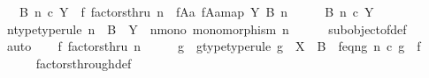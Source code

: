 \begin{isabellebody}
\ \ \ {\isachardoublequoteopen}{\isacharparenleft}{\kern0pt}B{\isacharcomma}{\kern0pt}\ n{\isacharparenright}{\kern0pt}\ {\isasymsubseteq}\isactrlsub c\ Y\ {\isasymLongrightarrow}\ f\ factorsthru\ n\ {\isasymLongrightarrow}\ {\isacharparenleft}{\kern0pt}f{\isasymlparr}A{\isasymrparr}\isactrlbsub a\isactrlesub {\isacharcomma}{\kern0pt}\ {\isacharbrackleft}{\kern0pt}f{\isasymlparr}A{\isasymrparr}\isactrlbsub a\isactrlesub {\isacharbrackright}{\kern0pt}map{\isacharparenright}{\kern0pt}\ {\isasymsubseteq}\isactrlbsub Y\isactrlesub \ {\isacharparenleft}{\kern0pt}B{\isacharcomma}{\kern0pt}\ n{\isacharparenright}{\kern0pt}{\isachardoublequoteclose}\isanewline
%
\isadelimproof
%
\endisadelimproof
%
\isatagproof
{}\isamarkupfalse%
\ {\isacharminus}{\kern0pt}\isanewline
\ \ \isamarkupfalse%
\ {\isachardoublequoteopen}{\isacharparenleft}{\kern0pt}B{\isacharcomma}{\kern0pt}\ n{\isacharparenright}{\kern0pt}\ {\isasymsubseteq}\isactrlsub c\ Y{\isachardoublequoteclose}\isanewline
\ \ \isamarkupfalse%
\ \isamarkupfalse%
\ n{\isacharunderscore}{\kern0pt}type{\isacharbrackleft}{\kern0pt}type{\isacharunderscore}{\kern0pt}rule{\isacharbrackright}{\kern0pt}{\isacharcolon}{\kern0pt}\ {\isachardoublequoteopen}n\ {\isacharcolon}{\kern0pt}\ B\ {\isasymrightarrow}\ Y{\isachardoublequoteclose}\ \ n{\isacharunderscore}{\kern0pt}mono{\isacharcolon}{\kern0pt}\ {\isachardoublequoteopen}monomorphism\ n{\isachardoublequoteclose}\isanewline
\ \ \ \ \isamarkupfalse%
\ subobject{\isacharunderscore}{\kern0pt}of{\isacharunderscore}{\kern0pt}def{}\ \isamarkupfalse%
\ auto\isanewline
\ \ \isamarkupfalse%
\ {\isachardoublequoteopen}f\ factorsthru\ n{\isachardoublequoteclose}\isanewline
\ \ \isamarkupfalse%
\ \isamarkupfalse%
\ g\ \ g{\isacharunderscore}{\kern0pt}type{\isacharbrackleft}{\kern0pt}type{\isacharunderscore}{\kern0pt}rule{\isacharbrackright}{\kern0pt}{\isacharcolon}{\kern0pt}\ {\isachardoublequoteopen}g\ {\isacharcolon}{\kern0pt}\ X\ {\isasymrightarrow}\ B{\isachardoublequoteclose}\ \ f{\isacharunderscore}{\kern0pt}eq{\isacharunderscore}{\kern0pt}ng{\isacharcolon}{\kern0pt}\ {\isachardoublequoteopen}n\ {\isasymcirc}\isactrlsub c\ g\ {\isacharequal}{\kern0pt}\ f{\isachardoublequoteclose}\isanewline
\ \ \ \ \isamarkupfalse%
\ factors{\isacharunderscore}{\kern0pt}through{\isacharunderscore}{\kern0pt}def{}\ \isamarkupfalse%

\end{isabellebody}
